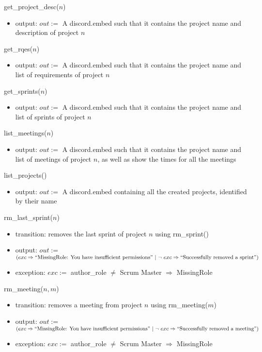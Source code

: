 \documentclass[12pt, titlepage]{article}
\begin{document}
\noindent get\_project\_desc($n$)
\begin{itemize}
    \item output: $out :=$ A discord.embed such that it contains the project name and description of project $n$
\end{itemize}

\noindent get\_rqes($n$)
\begin{itemize}
    \item output: $out :=$ A discord.embed such that it contains the project name and list of requirements of project $n$
\end{itemize}

\noindent get\_sprints($n$)
\begin{itemize}
    \item output: $out :=$ A discord.embed such that it contains the project name and list of sprints of project $n$
\end{itemize}

\noindent list\_meetings($n$)
\begin{itemize}
    \item output: $out :=$ A discord.embed such that it contains the project name and list of meetings of project $n$, as well as show the times for all the meetings
\end{itemize}

\noindent list\_projects()
\begin{itemize}
    \item output: $out :=$ A discord.embed containing all the created projects, identified by their name
\end{itemize}

\noindent rm\_last\_sprint($n$)
\begin{itemize}
    \item transition: removes the last sprint of project $n$ using rm\_sprint()
    \item output: $out :=$ $(exc \Rightarrow ``\text{MissingRole: You have insufficient permissions}"\ |\ \lnot\ exc \Rightarrow ``\text{Successfully removed a sprint}")$
    \item exception: $exc :=$ author\_role $\neq$ Scrum Master $\Rightarrow$ MissingRole
\end{itemize}

\noindent rm\_meeting($n, m$)
\begin{itemize}
    \item transition: removes a meeting from project $n$ using rm\_meeting($m$)
    \item output: $out :=$ $(exc \Rightarrow ``\text{MissingRole: You have insufficient permissions}"\ |\ \lnot\ exc \Rightarrow ``\text{Successfully removed a meeting}")$
    \item exception: $exc :=$ author\_role $\neq$ Scrum Master $\Rightarrow$ MissingRole
\end{itemize}
\end{document}
